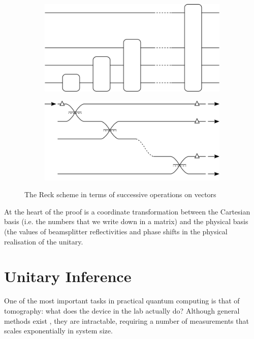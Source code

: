 \begin{figure}
  \begin{subfigure}{0.43\textwidth}
    \centering
    \includegraphics{figures/reck_schematic}
    \caption{}
    \label{fig:ReckSchematic}
  \end{subfigure}
  \hspace{0.04\textwidth}
  \begin{subfigure}{0.53\textwidth}
    \centering
    \includegraphics{figures/cascade}
    \caption{}
    \label{fig:Cascade}
  \end{subfigure}
  \caption[The Reck scheme in terms of successive operations on vectors]
  {The Reck scheme in terms of successive operations on vectors}
  \label{fig:ReckCascade}
\end{figure}

At the heart of the proof is a coordinate transformation between the Cartesian
basis (i.e. the numbers that we write down in a matrix) and the physical basis
(the values of beamsplitter reflectivities and phase shifts in the physical
realisation of the unitary.

\section{Unitary Inference}
\label{sec:UnitaryInference}
One of the most important tasks in practical quantum computing is that of
tomography: what does the device in the lab actually do? Although general
methods exist , they are intractable, requiring a number
of measurements that scales exponentially in system size.
